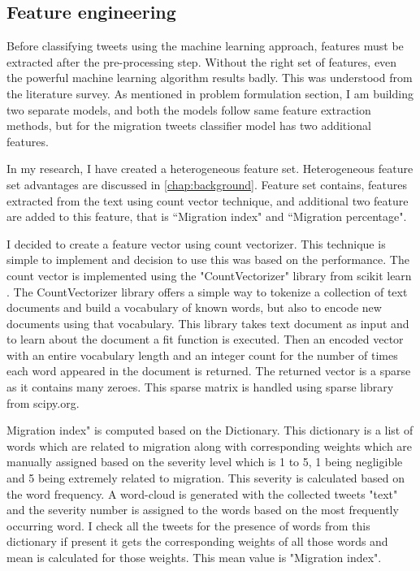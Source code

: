 \subsection{Feature engineering} \label{featureengineering}


 
Before classifying tweets using the machine learning approach, features must be extracted after the pre-processing step. Without the right set of features, even the powerful machine learning algorithm results badly. This was understood from the literature survey. As mentioned in problem formulation section, I am building two separate models, and both the models follow same feature extraction methods, but for the migration tweets classifier model has two additional features.

In my research, I have created a heterogeneous feature set. Heterogeneous feature set advantages are discussed in \ref{chap:background}. Feature set contains, features extracted from the text using count vector technique, and additional two feature are added to this feature, that is ``Migration index" and ``Migration percentage".   

I decided to create a feature vector using count vectorizer. This technique is simple to implement and decision to use this was based on the performance. The count vector is implemented using the "CountVectorizer" library from scikit learn \cite{scikit-learn}. The CountVectorizer library offers a simple way to tokenize a collection of text documents and build a vocabulary of known words, but also to encode new documents using that vocabulary. This library takes text document as input and to learn about the document a fit function is executed. Then an encoded vector with an entire vocabulary length and an integer count for the number of times each word appeared in the document is returned. The returned vector is a sparse as it contains many zeroes. This sparse matrix is handled using sparse library from scipy.org.

Migration index" is computed based on the Dictionary. This dictionary is a list of words which are related to migration along with corresponding weights which are manually assigned based on the severity level which is 1 to 5, 1 being negligible and 5 being extremely related to migration. This severity is calculated based on the word frequency. A word-cloud is generated with the collected tweets "text" and the severity number is assigned to the words based on the most frequently occurring word.
 I check all the tweets for the presence of words from this dictionary if present it gets the corresponding weights of all those words and mean is calculated for those weights. This mean value is "Migration index". 
 



